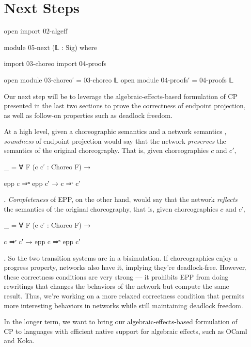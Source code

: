 \section{Next Steps}
\label{sec:next}

\begin{code}[hide]
open import 02-algeff

module 05-next (𝕃 : Sig) where

import 03-choreo
import 04-proofs

open module 03-choreo′ = 03-choreo 𝕃
open module 04-proofs′ = 04-proofs 𝕃

\end{code}

Our next step will be to leverage the algebraic-effects-based formulation of CP presented in the last two sections to prove the correctness of endpoint projection, as well as follow-on properties such as deadlock freedom.

At a high level, given a choreographic semantics  and a network semantics , \emph{soundness} of endpoint projection would say that the network \emph{preserves} the semantics of the original choreography.
%
That is, given choreographies $c$ and $c'$,
%
\begin{code}[hide]
_ = ∀ {F} (c c′ : Choreo F) →
\end{code}
%
\begin{code}[inline]
  epp c ⇒ⁿ epp c′ → c ⇒ᶜ c′
\end{code}.
%
\emph{Completeness} of EPP, on the other hand, would say that the network \emph{reflects} the semantics of the original choreography, that is, given choreographies $c$ and $c′$,
%
\begin{code}[hide]
_ = ∀ {F} (c c′ : Choreo F) →
\end{code}
%
\begin{code}[inline]
  c ⇒ᶜ c′ → epp c ⇒ⁿ epp c′
\end{code}.
%
So the two transition systems are in a bisimulation.
%
If choreographies enjoy a progress property, networks also have it, implying they're deadlock-free.
%
However, these correctness conditions are very strong --- it prohibits EPP from doing rewritings that changes the behaviors of the network but compute the same result.
%
Thus, we're working on a more relaxed correctness condition that permits more interesting behaviors in networks while still maintaining deadlock freedom.

In the longer term, we want to bring our algebraic-effects-based formulation of CP to languages with efficient native support for algebraic effects, such as OCaml and Koka.
